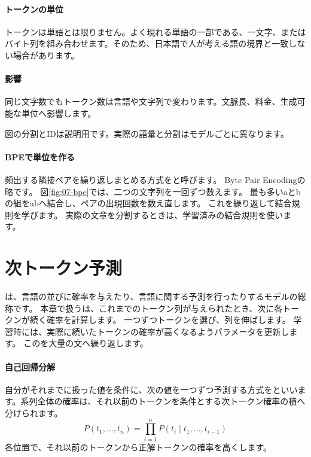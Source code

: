 \paragraph{トークンの単位}
        トークンは単語とは限りません。よく現れる単語の一部である、一文字、またはバイト列を組み合わせます。そのため、日本語で人が考える語の境界と一致しない場合があります。

\par
\endgroup
\medskip
\begingroup
\paragraph{影響}
        同じ文字数でもトークン数は言語や文字列で変わります。文脈長、料金、生成可能な単位へ影響します。

\par
\endgroup
  図の分割とIDは説明用です。実際の語彙と分割はモデルごとに異なります。
\par
\endgroup


\paragraph{BPEで単位を作る}
頻出する隣接ペアを繰り返しまとめる方式をと呼びます。
Byte Pair Encodingの略です。
図\ref{fig:07-bpe}では、二つの文字列を一回ずつ数えます。
最も多いaとbの組をabへ結合し、ペアの出現回数を数え直します。
これを繰り返して結合規則を学びます。
実際の文章を分割するときは、学習済みの結合規則を使います。

\section{次トークン予測}
\label{sec:06-machine-learning-28}

は、言語の並びに確率を与えたり、言語に関する予測を行ったりするモデルの総称です。
本章で扱うは、これまでのトークン列が与えられたとき、次に各トークンが続く確率を計算します。
一つずつトークンを選び、列を伸ばします。
学習時には、実際に続いたトークンの確率が高くなるようパラメータを更新します。
このを大量の文へ繰り返します。

\begingroup
\begingroup
\paragraph{自己回帰分解}
        自分がそれまでに扱った値を条件に、次の値を一つずつ予測する方式をといいます。系列全体の確率は、それ以前のトークンを条件とする次トークン確率の積へ分けられます。
        \[
          P(t_1,\ldots,t_n)
          =\prod_{i=1}^{n}
          P(t_i\mid t_1,\ldots,t_{i-1})
        \]
        各位置で、それ以前のトークンから正解トークンの確率を高くします。

